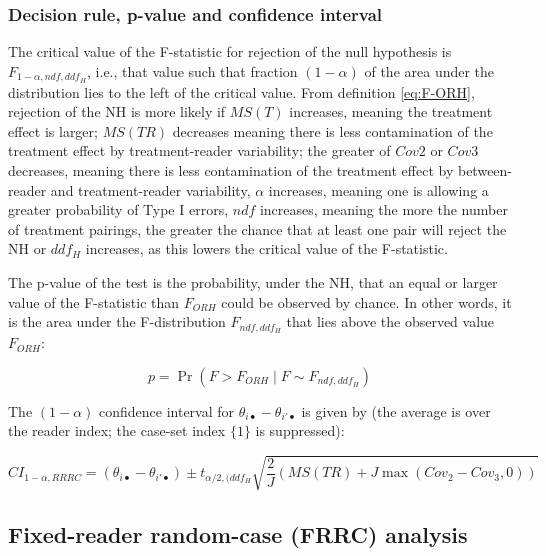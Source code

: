 \documentclass[
]{book}
\begin{document}
\hypertarget{decision-rule-p-value-and-confidence-interval}{%
\subsubsection{Decision rule, p-value and confidence interval}\label{decision-rule-p-value-and-confidence-interval}}

The critical value of the F-statistic for rejection of the null hypothesis is \(F_{1-\alpha,ndf,ddf_H}\), i.e., that value such that fraction \((1-\alpha)\) of the area under the distribution lies to the left of the critical value. From definition \eqref{eq:F-ORH}, rejection of the NH is more likely if \(MS(T)\) increases, meaning the treatment effect is larger; \(MS(TR)\) decreases meaning there is less contamination of the treatment effect by treatment-reader variability; the greater of \(Cov2\) or \(Cov3\) decreases, meaning there is less contamination of the treatment effect by between-reader and treatment-reader variability, \(\alpha\) increases, meaning one is allowing a greater probability of Type I errors, \(ndf\) increases, meaning the more the number of treatment pairings, the greater the chance that at least one pair will reject the NH or \(ddf_H\) increases, as this lowers the critical value of the F-statistic.

The p-value of the test is the probability, under the NH, that an equal or larger value of the F-statistic than \(F_{ORH}\) could be observed by chance. In other words, it is the area under the F-distribution \(F_{ndf,ddf_H}\) that lies above the observed value \(F_{ORH}\):

\begin{equation}
p=\Pr(F>F_{ORH} \mid F\sim F_{ndf,ddf_H})
\label{eq:pValueORHRRRC}
\end{equation}

The \((1-\alpha)\) confidence interval for \(\theta_{i \bullet} - \theta_{i' \bullet}\) is given by (the average is over the reader index; the case-set index \(\{1\}\) is suppressed):

\begin{equation}
CI_{1-\alpha,RRRC}=(\theta_{i \bullet} - \theta_{i' \bullet}) \pm t_{\alpha/2, (ddf_H}\sqrt{\frac{2}{J}(MS(TR)+J\max(Cov_2-Cov_3,0))}
\label{eq:CIalpha-RRRC}
\end{equation}

\hypertarget{fixed-reader-random-case-frrc-analysis}{%
\subsection{Fixed-reader random-case (FRRC) analysis}\label{fixed-reader-random-case-frrc-analysis}}
\end{document}
